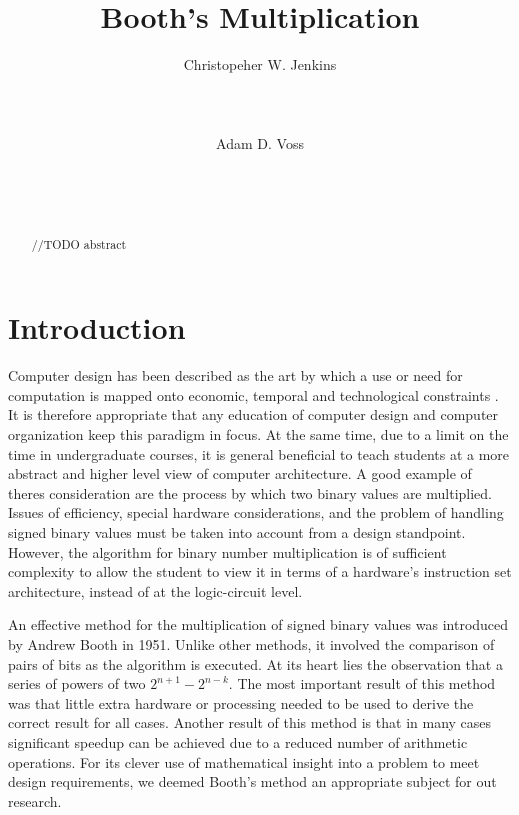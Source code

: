 \documentclass{acm_proc_article-sp}
\begin{document}
\title{Booth's Multiplication}

\author{
    \alignauthor
    Christopeher W. Jenkins\\
       \\
       \\
       \\
    \alignauthor
    Adam D. Voss\\
       \\
       \\
       \\
}

\maketitle

\begin{abstract}
//TODO abstract
\end{abstract}

\section{Introduction}
Computer design has been described as the art by which a use or need for computation is mapped onto economic, temporal and technological constraints \cite{ibm370}.  It is therefore appropriate that any education of computer design and computer organization keep this paradigm in focus.  At the same time, due to a limit on the time in undergraduate courses, it is general beneficial to teach students at a more abstract and higher level view of computer architecture.  A good example of theres consideration are the process by which two binary values are multiplied.  Issues of efficiency, special hardware considerations, and the problem of handling signed binary values must be taken into account from a design standpoint.  However, the algorithm for binary number multiplication is of sufficient complexity to allow the student to view it in terms of a hardware's instruction set architecture, instead of at the logic-circuit level.

An effective method for the multiplication of signed binary values was introduced by Andrew Booth in 1951. Unlike other methods, it involved the comparison of pairs of bits as the algorithm is executed.  At its heart lies the observation that a series of powers of two $2^{n+1} - 2^{n-k}$. The most important result of this method was that little extra hardware or processing needed to be used to derive the correct result for all cases\cite{needsCitation}. Another result of this method is that in many cases significant speedup can be achieved due to a reduced number of arithmetic operations. For its clever use of mathematical insight into a problem to meet design requirements, we deemed Booth's method an appropriate subject for out research\cite{booth}. %
\end{document}
